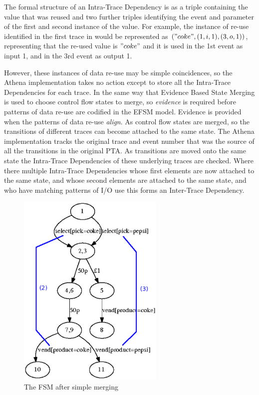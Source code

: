 The formal structure of an Intra-Trace Dependency is as a triple containing the value that was reused and two further triples identifying the event and parameter of the first and second instance of the value. For example, the instance of re-use identified in the first trace in  would be represented as $("coke",(1,i,1),(3,o,1))$, representing that the re-used value is $"coke"$ and it is used in the 1st event as input 1, and in the 3rd event as output 1.

However, these instances of data re-use may be simple coincidences, so the Athena implementation takes no action except to store all the Intra-Trace Dependencies for each trace. In the same way that Evidence Based State Merging is used to choose control flow states to merge, so \emph{evidence} is required before patterns of data re-use are codified in the EFSM model. Evidence is provided when the patterns of data re-use \emph{align}. As control flow states are merged, so the transitions of different traces can become attached to the same state. The Athena implementation tracks the original trace and event number that was the source of all the transitions in the original PTA. As transitions are moved onto the same state the Intra-Trace Dependencies of these underlying traces are checked. Where there multiple Intra-Trace Dependencies whose first elements are now attached to the same state, and whose second elements are attached to the same state, and who have matching patterns of I/O use this forms an Inter-Trace Dependency. 

\begin{figure}[h]
\begin{center}
\includegraphics[width=7cm]{figures/efsm/vend2-withannotations.eps}
\caption{The FSM after simple merging}
\label{fig:FSM}
\end{center}
\end{figure}


